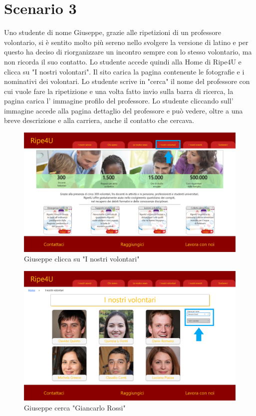     \section{Scenario 3}
    Uno studente di nome Giuseppe, grazie alle ripetizioni di un professore
    volontario, si è sentito molto più sereno nello svolgere la versione di
    latino e per questo ha deciso di riorganizzare un incontro sempre con lo
    stesso volontario, ma non ricorda il suo contatto. Lo studente accede quindi
    alla Home di Ripe4U e clicca su "I nostri volontari". Il sito carica la
    pagina contenente le fotografie e i nominativi dei volontari. Lo studente
    scrive in "cerca" il nome del professore con cui vuole fare la ripetizione e
    una volta fatto invio sulla barra di ricerca, la pagina carica l'
    immagine profilo del professore. Lo studente cliccando sull' immagine
    accede alla pagina dettaglio del professore e può vedere, oltre a una breve
    descrizione e alla carriera, anche il contatto che cercava.
    \begin{figure}[H]
        \centering
        \includegraphics[scale=0.25]{resources/images/scenario3-1.png}
        \caption{Giuseppe clicca su "I nostri volontari"}
    \end{figure}
    \begin{figure}[H]
        \centering
        \includegraphics[scale=0.25]{resources/images/scenario3-2.png}
        \caption{Giuseppe cerca "Giancarlo Rossi"}
    \end{figure}
